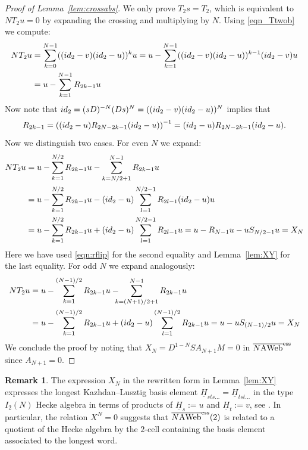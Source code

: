 \documentclass[11pt]{article}
\theoremstyle{definition}
\newtheorem{rema}[theo]{Remark}
\numberwithin{equation}{section}
\newcommand{\id}{{\rm id}}
\newcommand{\cat}[1]{\ensuremath{\mbox{\bfseries {\upshape {#1}}}}}
\newcommand{\wrap}{D}
\newcommand{\AWeb}[1][]{#1\cat{A}\cat{Web}}
\newcommand{\essbAWeb}[1][]{\overline{#1\AWeb}^{\mathrm{ess}}}
\begin{document}
\begin{proof}[Proof of Lemma~\ref{lem:crossabs}]
We only prove $T_2 s=T_2$, which is equivalent to $N T_2 u=0$ by expanding the crossing and multiplying by $N$. Using \eqref{eqn_Ttwob} we compute: 
\begin{align*} 
  N T_2 u &=  \sum_{k=0}^{N-1} ((\id_2-v)(\id_2-u))^k u = u - \sum_{k=1}^{N-1} ((\id_2-v)(\id_2-u))^{k-1} (\id_2-v)u \\
  &= u - \sum_{k=1}^{N-1} R_{2k -1} u
\end{align*}
Now note that $\id_2 = (s \wrap)^{-N} (\wrap s)^N = ((\id_2-v)(\id_2-u))^N$ implies that 
\begin{equation}
\label{eqn:rflip}
R_{2k-1} = \left( (\id_2-u) R_{2N-2k-1} (\id_2-u)\right)^{-1} = (\id_2-u) R_{2N-2k-1} (\id_2-u).
\end{equation}
Now we distinguish two cases. For even $N$ we expand:
\begin{align*} 
N T_2 u  &= u - \sum_{k=1}^{N/2} R_{2k -1} u - \sum_{k=N/2+1}^{N-1} R_{2k -1} u
\\
&= u - \sum_{k=1}^{N/2} R_{2k -1} u - (\id_2-u)\sum_{l=1}^{N/2-1} R_{2l -1}(\id_2-u)u\\
&= u - \sum_{k=1}^{N/2} R_{2k -1} u + (\id_2-u)\sum_{l=1}^{N/2-1} R_{2l -1}u = u - R_{N-1} u - u S_{N/2-1} u = X_N 
\end{align*}
Here we have used \eqref{eqn:rflip} for the second equality and Lemma~\ref{lem:XY} for the last equality. For odd $N$ we expand analogously:
\begin{align*} 
N T_2 u  &= u - \sum_{k=1}^{(N-1)/2} R_{2k -1} u - \!\!\!\!\sum_{k=(N+1)/2+1}^{N-1} R_{2k -1} u\\
&= u - \sum_{k=1}^{(N-1)/2} R_{2k -1} u + (\id_2-u)\sum_{l=1}^{(N-1)/2} R_{2k -1} u = u- u S_{(N-1)/2}u = X_N
\end{align*}
We conclude the proof by noting that $X_N=\wrap^{1-N} S A_{N+1} M=0$ in $\essbAWeb[N]$ since $A_{N+1}=0$. 
\end{proof}

\begin{rema}
The expression $X_N$ in the rewritten form in Lemma~\ref{lem:XY} expresses the
longest Kazhdan--Lusztig basis element $\underline{H}_{s t
s\dots}=\underline{H}_{t s t\dots}$ in the type $I_2(N)$ Hecke algebra in terms
of products of $\underline{H}_s:=u$ and $\underline{H}_t:=v$, see \cite[Section
2.3]{EW}. In particular, the relation $X^N=0$ suggests that $\essbAWeb[N](2)$ is
related to a quotient of the Hecke algebra by the $2$-cell containing the basis
element associated to the longest word. 
\end{rema}
\end{document}
